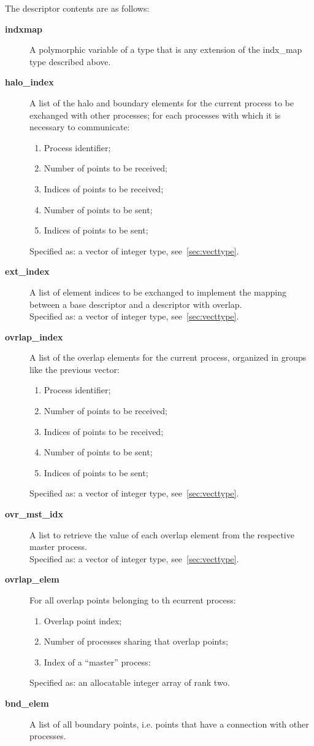 The descriptor contents are as follows:
\begin{description}
\item[{\bf indxmap}] A polymorphic variable of a type that is any
  extension of the indx\_map type described above. \\
\item[{\bf halo\_index}] A list of the halo and boundary elements for
the current process to be exchanged with other processes; for each
processes with which it is necessary to communicate:
\begin{enumerate}
\item Process identifier;
\item Number of points to be received;
\item Indices of points to be received;
\item Number of points to be sent;
\item Indices of points to be sent;
\end{enumerate}
Specified as: a vector of integer type, see~\ref{sec:vecttype}.
\item[{\bf ext\_index}] A list of element indices to be exchanged to
  implement the mapping between a base descriptor and a descriptor
  with overlap. \\
Specified as: a vector of integer type, see~\ref{sec:vecttype}.
\item [{\bf ovrlap\_index}] A list of the overlap elements for the
current process, organized in groups like the previous vector:
\begin{enumerate}
\item Process identifier;
\item Number of points to be received;
\item Indices of points to be received;
\item Number of points to be sent;
\item Indices of points to be sent;
\end{enumerate}
Specified as: a vector of integer type, see~\ref{sec:vecttype}.
\item [{\bf ovr\_mst\_idx}] A list to retrieve the value of each
  overlap element from the respective master process.\\
Specified as: a vector of integer type, see~\ref{sec:vecttype}.
\item [{\bf ovrlap\_elem}] For all overlap points belonging to th
ecurrent process:
\begin{enumerate}
\item Overlap point index;
\item Number of processes sharing that overlap points;
\item Index of a ``master'' process: 
\end{enumerate}
Specified as: an allocatable integer array of rank two.
\item [{\bf bnd\_elem}] A list of all boundary points, i.e. points
  that have a connection with other processes.
\end{description}
